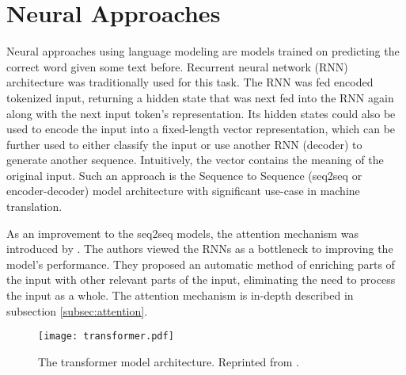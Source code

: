 \section{Neural Approaches}
\label{sec:neural_approaches}

Neural approaches using language modeling are models trained on predicting the correct word given some text before.  %
Recurrent neural network (RNN) architecture was traditionally used for this task.
The RNN was fed encoded tokenized input, returning a hidden state that was next fed into the RNN again along with the next input token's representation.
Its hidden states could also be used to encode the input into a fixed-length vector representation, which can be further used to either classify the input or use another RNN (decoder) to generate another sequence.
Intuitively, the vector contains the meaning of the original input. 
Such an approach is the Sequence to Sequence (seq2seq or encoder-decoder) model architecture \citep{seq2seq} with significant use-case in machine translation.

As an improvement to the seq2seq models, the attention mechanism was introduced by \citet{first-attention}.
The authors viewed the RNNs as a bottleneck to improving the model's performance.
They proposed an automatic method of enriching parts of the input with other relevant parts of the input, eliminating the need to process the input as a whole.
The attention mechanism is in-depth described in subsection \ref{subsec:attention}.

\begin{figure}[b!]
        \centering
        \texttt{[image: transformer.pdf]}
        \caption[Transformer Model Architecture]{The transformer model architecture. Reprinted from \citep{attention-is-all-you-need}.}
        \label{fig:transformer}
\end{figure}

